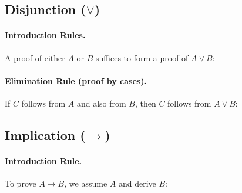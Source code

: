 \subsection*{Disjunction ($\lor$)}

\paragraph{Introduction Rules.}
A proof of either $A$ or $B$ suffices to form a proof of
$A \lor B$:

\noindent
\begin{minipage}[t]{0.48\textwidth}
  \vspace{0pt}
  \begin{prooftree}
  \end{prooftree}
\end{minipage}\hfill
\begin{minipage}[t]{0.48\textwidth}
  \vspace{0pt}
  \begin{prooftree}
  \end{prooftree}
\end{minipage}

\paragraph{Elimination Rule (proof by cases).}
If $C$ follows from $A$ and also from $B$, then $C$ follows from
$A \lor B$:
\begin{prooftree}
\end{prooftree}

\subsection*{Implication ($\to$)}

\paragraph{Introduction Rule.}
To prove $A \to B$, we assume $A$ and derive $B$:
\begin{prooftree}
\end{prooftree}

